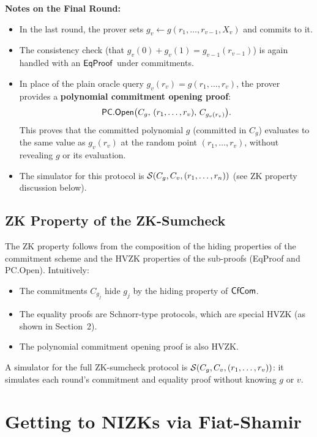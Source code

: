 \documentclass[11pt]{article}
\begin{document}
\medskip
\noindent\textbf{Notes on the Final Round:}
\begin{itemize}
  \item In the last round, the prover sets
        $g_v \leftarrow g(r_1,\ldots,r_{v-1}, X_v)$ and commits
        to it.
  \item The consistency check (that $g_v(0)+g_v(1) = g_{v-1}(r_{v-1})$)
        is again handled with an $\mathsf{EqProof}$ under commitments.
  \item In place of the plain oracle query $g_v(r_v) = g(r_1,\ldots,r_v)$,
        the prover provides a \textbf{polynomial commitment opening proof}:
        \[
          \mathsf{PC.Open}\bigl(C_g,\,(r_1,\ldots,r_v),\,C_{g_v(r_v)}\bigr).
        \]
        This proves that the committed polynomial $g$ (committed in $C_g$)
        evaluates to the same value as $g_v(r_v)$ at the random point
        $(r_1,\ldots,r_v)$, without revealing $g$ or its evaluation.
  \item The simulator for this protocol is
        $\mathcal{S}(C_g, C_v, (r_1, \ldots, r_n))$ (see ZK property
        discussion below).
\end{itemize}

\subsection{ZK Property of the ZK-Sumcheck}

The ZK property follows from the composition of the hiding properties
of the commitment scheme and the HVZK properties of the sub-proofs
(EqProof and PC.Open).  Intuitively:
\begin{itemize}
  \item The commitments $C_{g_j}$ hide $g_j$ by the hiding property
        of $\mathsf{CfCom}$.
  \item The equality proofs are Schnorr-type protocols, which are
        special HVZK (as shown in Section~2).
  \item The polynomial commitment opening proof is also HVZK.
\end{itemize}
A simulator for the full ZK-sumcheck protocol is
$\mathcal{S}(C_g, C_v, (r_1,\ldots,r_v))$: it simulates each round's
commitment and equality proof without knowing $g$ or $v$.

\section{Getting to NIZKs via Fiat-Shamir}
\end{document}
